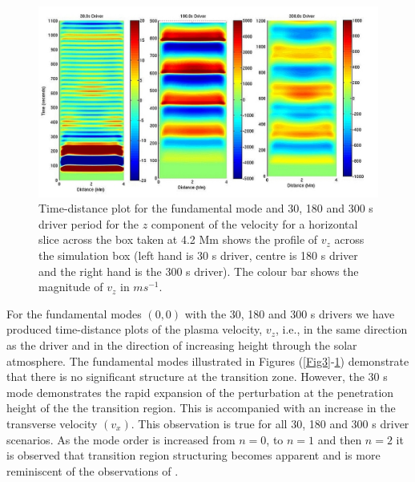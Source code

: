 \documentclass[preprint,authoryear,12pt]{elsarticle}
\begin{document}
\begin{figure}[h]
\includegraphics[scale=1]{imrescale/fig5_dt_30_180_300_0_horiz_4p2Mm.jpg}
\caption{Time-distance plot for the fundamental mode and 30, 180 and 300 s driver period for the $z$ component of the velocity for a horizontal slice across the box  taken at 4.2 Mm shows  the profile of $v_{z}$ across the simulation box (left hand is 30 s driver, centre is 180 s driver and the right hand is the 300 s driver). The colour bar shows the magnitude of $v_z$ in $ms^{-1}$.}
\label{Fig6}
\end{figure}



For the fundamental modes $(0, 0)$ with the 30, 180 and 300 s drivers we have produced time-distance plots of the plasma velocity, $v_z$, i.e., in the same direction as the driver and in the direction of increasing height through the solar atmosphere. The fundamental modes illustrated in Figures (\ref{Fig3}-\ref{Fig6})  demonstrate that there is no significant structure at the transition zone. However, the 30 s mode demonstrates the rapid expansion of the perturbation at the penetration height of the the transition region. This is accompanied with an increase in the transverse velocity $(v_x)$. This observation is true for all 30, 180 and 300 s driver scenarios. As the mode order is increased from $n=0$, to $n=1$ and then $n=2$ it is observed that transition region structuring becomes apparent and is more reminiscent of the observations of \citet{Malins2007A}.
\end{document}
